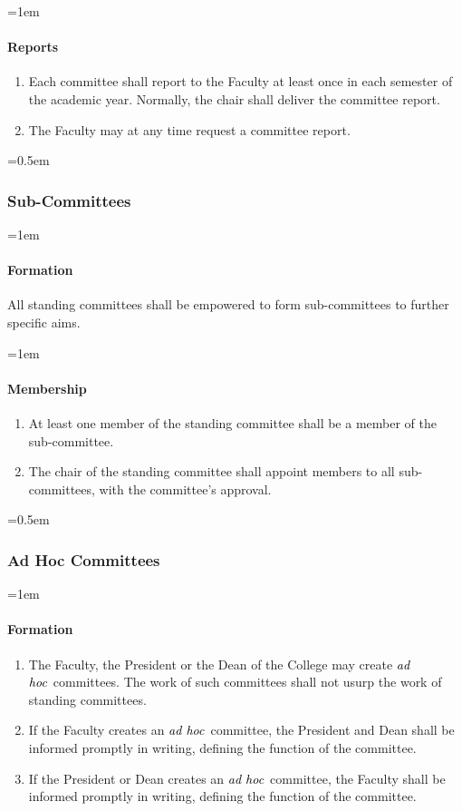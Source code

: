 \documentclass{manual}
\newcommand{\keyword}[1]{\textcolor{black}{#1}}
\newcommand{\adho}{\keyword{\textit{ad hoc}}~}
\let\oldsubsubsection\subsubsection
\renewcommand\subsubsection{\leftskip=0.5em\oldsubsubsection}
\let\oldparagraph\paragraph
\renewcommand\paragraph{\leftskip=1em\oldparagraph}
\newcommand{\itemLevelA}{\alph*.}
\newcommand{\itemRefA}{\alph*}
\begin{document}
\paragraph{Reports}

\begin{enumerate}[label=\itemLevelA,ref=\itemRefA]
\item Each committee shall report to the Faculty at least once in each semester of the academic year. Normally, the chair shall deliver the committee report.

\item The Faculty may at any time request a committee report. 
\end{enumerate}

\subsubsection{Sub-Committees}
\paragraph{Formation}
All standing committees shall be empowered to form sub-committees to further specific aims. 

\paragraph{Membership}
\begin{enumerate}[label=\itemLevelA,ref=\itemRefA]
\item At least one member of the standing committee shall be a member of the sub-committee.

\item The chair of the standing committee shall appoint members to all sub-committees, with the committee's approval.
\end{enumerate}

\subsubsection{Ad Hoc Committees}

\paragraph{Formation}
\begin{enumerate}[label=\itemLevelA,ref=\itemRefA]
\item The Faculty, the President or the Dean of the College may create \adho committees. The work of such committees shall not usurp the work of standing committees.

\item If the Faculty creates an \adho committee, the President and Dean shall be informed promptly in writing, defining the function of the committee.

\item If the President or Dean creates an \adho committee, the Faculty shall be informed promptly in writing, defining the function of the committee.
\end{enumerate}
\end{document}
